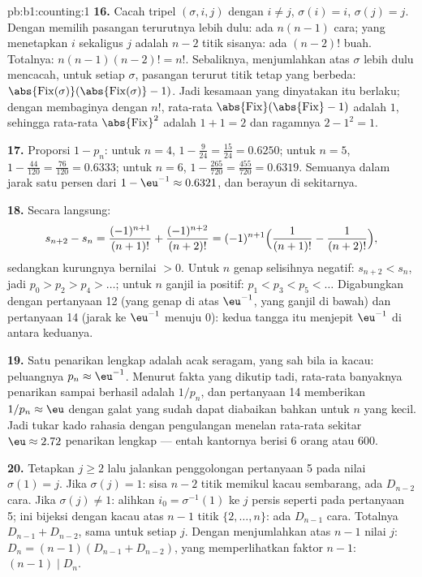 \begin{solution}{pb:b1:counting:1}
\textbf{16.} Cacah tripel $(\sigma, i, j)$ dengan $i \neq j$,
$\sigma(i) = i$, $\sigma(j) = j$. Dengan memilih pasangan terurutnya lebih dulu:
ada $n(n-1)$ cara;  yang menetapkan $i$ sekaligus $j$ adalah
 $n - 2$ titik sisanya: ada $(n-2)!$ buah.
Totalnya: $n(n-1)(n-2)! = n!$. Sebaliknya, menjumlahkan atas $\sigma$ lebih dulu
mencacah, untuk setiap $\sigma$, pasangan terurut titik tetap yang
berbeda: $\abs{\mathrm{Fix}(\sigma)}(\abs{\mathrm{Fix}(\sigma)}-1)$.
Jadi kesamaan yang dinyatakan itu berlaku; dengan membaginya dengan $n!$, rata-rata
$\abs{\mathrm{Fix}}(\abs{\mathrm{Fix}} - 1)$ adalah $1$, sehingga rata-rata
$\abs{\mathrm{Fix}}^2$ adalah $1 + 1 = 2$ dan ragamnya $2 -
1^2 = 1$.

\textbf{17.} Proporsi $1 - p_n$: untuk $n = 4$, $1 - \frac
9{24} = \frac{15}{24} = 0.6250$; untuk $n = 5$, $1 - \frac{44}{120} =
\frac{76}{120} = 0.6333$; untuk $n = 6$, $1 - \frac{265}{720} =
\frac{455}{720} = 0.6319$. Semuanya dalam jarak satu persen dari $1 - \eu^{-1}
\approx 0.6321$, dan berayun di sekitarnya.

\textbf{18.} Secara langsung:
\[
s_{n+2} - s_n = \frac{(-1)^{n+1}}{(n+1)!} +
\frac{(-1)^{n+2}}{(n+2)!}
= (-1)^{n+1}\Bigl(\frac1{(n+1)!} - \frac1{(n+2)!}\Bigr),
\]
sedangkan kurungnya bernilai $> 0$. Untuk $n$ genap selisihnya
negatif: $s_{n+2} < s_n$, jadi $p_0 > p_2 > p_4 > \dots$; untuk $n$
ganjil ia positif: $p_1 < p_3 < p_5 < \dots$ Digabungkan dengan
pertanyaan 12 (yang genap di atas $\eu^{-1}$, yang ganjil di bawah) dan pertanyaan 14
(jarak ke $\eu^{-1}$ menuju $0$): kedua tangga itu menjepit
$\eu^{-1}$ di antara keduanya.

\textbf{19.} Satu penarikan lengkap adalah  acak seragam,
yang sah bila ia  kacau: peluangnya $p_n \approx \eu^{-1}$.
Menurut fakta yang dikutip tadi, rata-rata banyaknya penarikan sampai berhasil adalah
$1/p_n$, dan pertanyaan 14 memberikan $1/p_n \approx \eu$ dengan galat
yang sudah dapat diabaikan bahkan untuk $n$ yang kecil. Jadi tukar kado rahasia dengan
pengulangan menelan rata-rata sekitar $\eu \approx 2.72$ penarikan
lengkap --- entah kantornya berisi $6$ orang atau $600$.

\textbf{20.} Tetapkan $j \geq 2$ lalu jalankan penggolongan pertanyaan 5 pada
nilai $\sigma(1) = j$. Jika $\sigma(j) = 1$: sisa
$n - 2$ titik memikul  kacau sembarang, ada $D_{n-2}$ cara. Jika
$\sigma(j) \neq 1$: alihkan  $i_0 = \sigma^{-1}(1)$ ke
$j$ persis seperti pada pertanyaan 5; ini bijeksi dengan
 kacau atas $n - 1$ titik $\{2, \dots, n\}$: ada $D_{n-1}$
cara. Totalnya $D_{n-1} + D_{n-2}$, sama untuk setiap $j$. Dengan menjumlahkan
atas $n - 1$ nilai $j$: $D_n = (n-1)(D_{n-1} + D_{n-2})$,
yang memperlihatkan faktor $n - 1$: $(n-1) \mid D_n$.


\end{solution}
